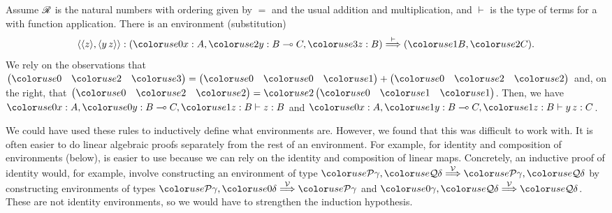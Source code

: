 
\begin{example}
  Assume $\mathscr R$ is the natural numbers with ordering given by $=$ and
  the usual addition and multiplication, and $\vdash$ is the type of
  terms for a  with function application.  There is
  an environment (substitution)
  \[
    \alr{\alr{z},\alr{y\,z}} :
    \plr{\gr0x : A, \gr2y : B \multimap C, \gr3z : B} \env\vdash
    \plr{\gr1B, \gr2C}.
  \]
  We rely on the observations that
  $\begin{pmatrix} \gr0 & \gr2 & \gr3 \end{pmatrix} =
  \begin{pmatrix} \gr0 & \gr0 & \gr1 \end{pmatrix}
  + \begin{pmatrix} \gr0 & \gr2 & \gr2 \end{pmatrix}$ and, on the right, that
  $\begin{pmatrix} \gr0 & \gr2 & \gr2 \end{pmatrix} =
  \gr2\begin{pmatrix} \gr0 & \gr1 & \gr1 \end{pmatrix}$.
  Then, we have $\gr0x : A, \gr0y : B \multimap C, \gr1z : B \vdash z : B$ and
  $\gr0x : A, \gr1y : B \multimap C, \gr1z : B \vdash y\,z : C$.
\end{example}

We could have used these rules to inductively define what environments are.
However, we found that this was difficult to work with. It is often easier to do
linear algebraic proofs separately from the rest of an environment.
For example, for identity and composition of environments (below), 
is easier to use because we can rely on the identity and composition of linear
maps.
Concretely, an inductive proof of identity would, for example, involve
constructing an environment of type
$\grP\gamma, \grQ\delta \env\V \grP\gamma, \grQ\delta$ by constructing
environments of types $\grP\gamma, \gr0\delta \env\V \grP\gamma$ and
$\gr0\gamma, \grQ\delta \env\V \grQ\delta$.
These are not identity environments, so we would have to strengthen the
induction hypothesis.



